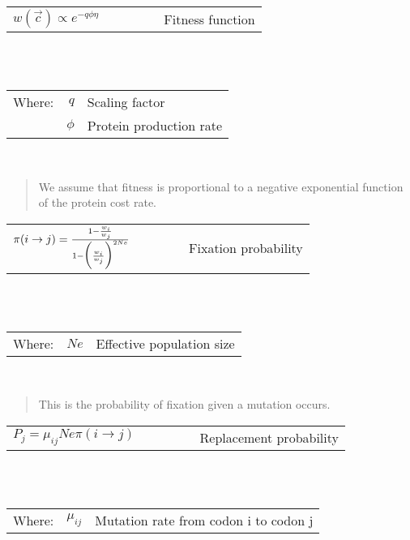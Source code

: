 \documentclass{article}
\begin{document}
	\begin{center}
	
	\begin{tabular}[c]{r |l|}

		\cline{2-2}
		{\Large $w(\vec{c}) \propto e^{-q\phi\eta}  \qquad \qquad$} & Fitness function\\
		\cline{2-2}
	\end{tabular}\\\
	
	\begin{tabular}{c r @{=} l}
		Where: & $q$ & Scaling factor\\
		& $\phi$ & Protein production rate\\
	\end{tabular}\\
	
	\end{center}
	
	\begin{quote}
		We assume that fitness is proportional to a negative exponential function of the protein cost rate. \\
	\end{quote} 
	
	\begin{center}
	
	\begin{tabular}[c]{r |l|}
		\cline{2-2}
		{\Large $ \pi(i \rightarrow j) = \frac{1-{\huge\frac{w_{i}}{w_{j}}}}{1-\bigg({\huge\frac{w_{i}}{w_{j}}}\bigg)^{2Ne}} \qquad \qquad$} & Fixation probability\\
		\cline{2-2}
	\end{tabular}\\\
	
	\begin{tabular}{c r @{=} l}
		Where: & $Ne$ & Effective population size\\
	\end{tabular}\\
	
	\end{center}
	
	\begin{quote}
		This is the probability of fixation given a mutation occurs. \\
	\end{quote} 
	
	\begin{center}
	
	\begin{tabular}[c]{r |l|}
		\cline{2-2}
		{\Large $P_{j} = \mu_{ij} Ne \pi(i \rightarrow j) \qquad \qquad$} & Replacement probability\\
		\cline{2-2}
	\end{tabular}\\\
	
	\begin{tabular}{c r @{=} l}
		Where: & $\mu_{ij}$ & Mutation rate from codon i to codon j\\
	\end{tabular}\\

	\end{center}
	
\end{document}
